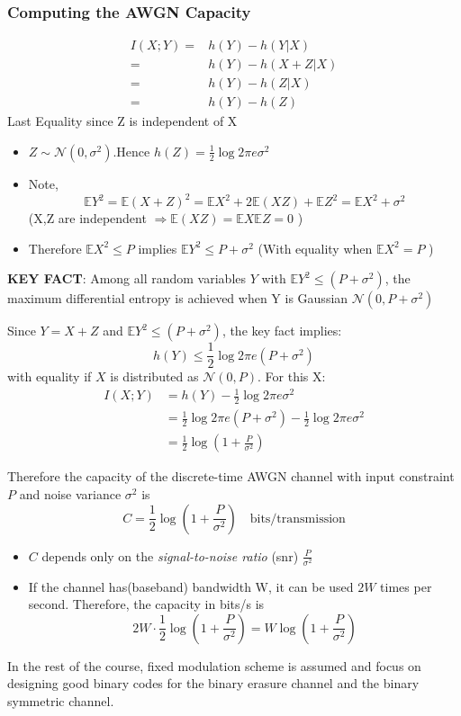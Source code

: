 \documentclass[12pt]{article}
\newcommand{\sigd}{\sigma^2}
\newcommand{\mexp}{\mathbb{E}}
\begin{document}
\subsubsection{Computing the AWGN Capacity}
\begin{align*}
    I(X;Y) =& h(Y) - h(Y|X) \\
    =& h(Y) - h(X+Z|X)\\
    =& h(Y) - h(Z|X)\\
    =& h(Y) - h(Z)
\end{align*}
Last Equality since Z is independent of X
\begin{itemize}
    \item $Z\sim \mathcal{N}(0,\sigd). $Hence $h(Z)=\frac{1}{2}\log 2\pi e\sigd$
    \item Note,
    \[
    \mexp Y^2= \mexp(X+Z)^2= \mexp X^2 + 2\mexp(XZ) + \mexp Z^2 = \mexp X^2 + \sigd
    \]
    (X,Z are independent $\Rightarrow \mexp(X Z) = \mexp X\mexp Z=0$ )
    \item Therefore $\mexp X^2\le P$ implies $\mexp Y^2 \le P+\sigd$ (With equality when $\mexp X^2 = P$ )
\end{itemize}
\textbf{KEY FACT}: Among all random variables $Y$ with $\mexp Y^2\le (P+\sigd)$, the maximum differential entropy is achieved when Y is Gaussian $\mathcal{N}(0,P+\sigd)$

Since $Y=X + Z$ and $\mexp Y^2 \le (P+\sigd)$, the key fact implies:
\[
h(Y)\le \frac{1}{2}\log 2\pi e(P+\sigd)
\]
with equality if $X$ is distributed as $\mathcal{N}(0,P)$. For this X:
\begin{align*}
    I(X;Y) &= h(Y) - \frac{1}{2}\log 2\pi e \sigd\\
    &= \frac{1}{2}\log 2\pi e(P+\sigd) -  \frac{1}{2}\log 2\pi e \sigd\\
    &=\frac{1}{2}\log\left(1+\frac{P}{\sigd}\right)
\end{align*}

Therefore the capacity of the discrete-time AWGN channel with input constraint $P$ and noise variance $\sigd$ is 
\[
C=\frac{1}{2}\log\left(1+\frac{P}{\sigd}\right) \quad \textrm{bits/transmission}
\]
\begin{itemize}
    \item $C$ depends only on the \textit{signal-to-noise ratio} (snr) $\frac{P}{\sigd}$
    \item If the channel has(baseband) bandwidth W, it can be used $2W$ times per second. Therefore, the capacity in bits/s is 
    \[
    2W \cdot \frac{1}{2}\log\left(1+\frac{P}{\sigd}\right) = W\log\left(1+\frac{P}{\sigd}\right)
    \]
\end{itemize}
In the rest of the course, fixed modulation scheme is assumed and focus on designing good binary codes for the binary erasure channel and the binary symmetric channel.
\end{document}
